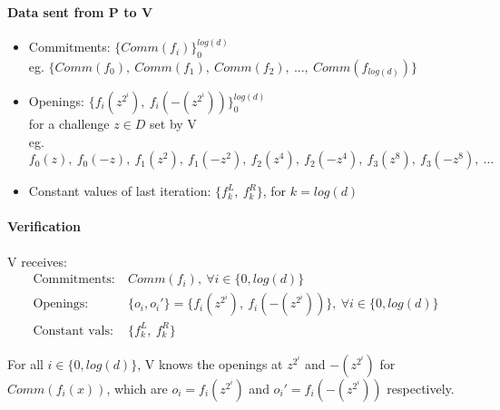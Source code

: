 \documentclass{article}
\theoremstyle{definition}
\begin{document}
\paragraph{Data sent from P to V}
\begin{itemize}
	\item[] Commitments: $\{Comm(f_i)\}_0^{log(d)}$\\
		{\scriptsize eg. $\{Comm(f_0),~ Comm(f_1),~ Comm(f_2),~ ...,~ Comm(f_{log(d)})\}$ }
	\item[] Openings: $\{ f_i(z^{2^i}),~f_i(-(z^{2^i})) \}_0^{log(d)}$\\
		for a challenge $z \in D$ set by V\\
		{\scriptsize eg. $f_0(z),~ f_0(-z),~ f_1(z^2),~ f_1(-z^2),~ f_2(z^4),~ f_2(-z^4),~ f_3(z^8),~ f_3(-z^8),~ \ldots$}
	\item[] Constant values of last iteration: $\{f_k^L,~f_k^R\}$, for $k=log(d)$
\end{itemize}

% 
% 


\paragraph{Verification}

V receives:
\begin{align*}
	\text{Commitments:}~ &Comm(f_i),~ \forall i \in \{0, log(d)\}\\
	\text{Openings:}~ &\{o_i, o_i'\}=\{ f_i(z^{2^i}),~f_i(-(z^{2^i})) \},~ \forall i \in \{0, log(d)\}\\
	\text{Constant vals:}~ &\{f_k^L,~f_k^R\}
\end{align*}

\vspace{20px}

For all $i \in \{0, log(d)\}$, V knows the openings at $z^{2^i}$ and $-(z^{2^i})$ for\\
$Comm(f_i(x))$, which are $o_i=f_i(z^{2^i})$ and $o_i'=f_i(-(z^{2^i}))$ respectively.
\end{document}
